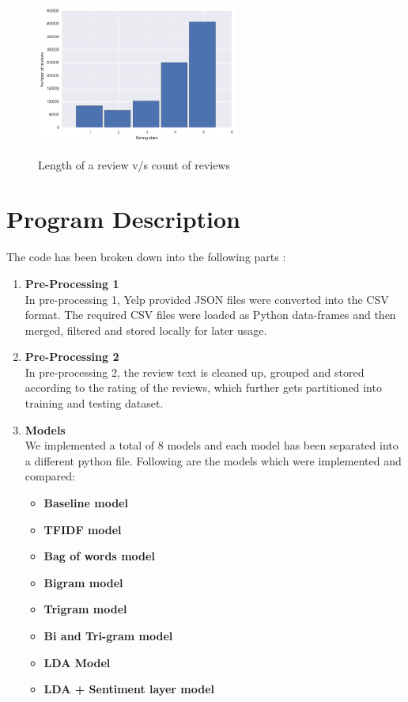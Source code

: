 \documentclass[paper=a4, fontsize=11pt]{scrartcl} %
\numberwithin{equation}{section} %
\numberwithin{figure}{section} %
\numberwithin{table}{section} %
\begin{document}
\begin{figure}[!htb]
\centering
\includegraphics[width=250px, height = 200px]{star_review_count.png}
\caption{Length of a review v/s count of reviews}
\label{star_distribution}
\end{figure} 

\section{Program Description}
The code has been broken down into the following parts : 

\begin{enumerate}
\item \textbf{Pre-Processing 1}\\
In pre-processing 1, Yelp provided JSON files were converted into the CSV format. The required CSV files were loaded as Python data-frames and then merged, filtered and stored locally for later usage.

\item \textbf{Pre-Processing 2}\\
In pre-processing 2, the review text is cleaned up, grouped and stored according to the rating of the reviews, which further gets partitioned into training and testing dataset.

\item	\textbf{Models}\\
We implemented a total of 8 models and each model has been separated into a different python file. Following are the models which were implemented and compared:
\begin{itemize}
\item \textbf{Baseline model}
\item \textbf{TFIDF model}
\item \textbf{Bag of words model}
\item \textbf{Bigram model}
\item \textbf{Trigram model}
\item \textbf{Bi and Tri-gram model}
\item \textbf{LDA Model}
\item \textbf{LDA + Sentiment layer model}
\end{itemize}
\end{enumerate}
\end{document}
